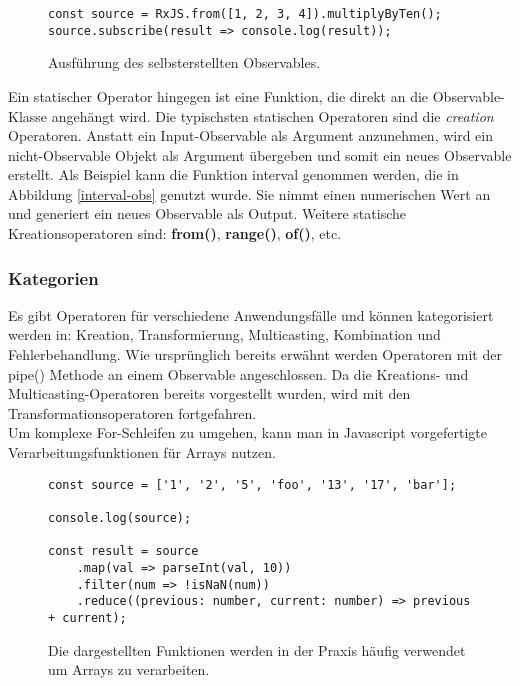 \begin{figure}[H]
\begin{lstlisting}[basicstyle=\small]
const source = RxJS.from([1, 2, 3, 4]).multiplyByTen();
source.subscribe(result => console.log(result));
\end{lstlisting}
\caption{Ausführung des selbsterstellten Observables.}
\end{figure}

\noindent
Ein statischer Operator hingegen ist eine Funktion, die direkt an die Observable-Klasse angehängt wird. Die typischsten statischen Operatoren sind die \textit{creation} Operatoren. Anstatt ein Input-Observable als Argument anzunehmen, wird ein nicht-Observable Objekt als Argument übergeben und somit ein neues Observable erstellt. Als Beispiel kann die Funktion interval genommen werden, die in Abbildung \ref{interval-obs} genutzt wurde. Sie nimmt einen numerischen Wert an und generiert ein neues Observable als Output. Weitere statische Kreationsoperatoren sind: \textbf{from()}, \textbf{range()}, \textbf{of()}, etc.

\subsubsection{Kategorien}

Es gibt Operatoren für verschiedene Anwendungsfälle und können kategorisiert werden in: Kreation, Transformierung, Multicasting, Kombination und Fehlerbehandlung. Wie ursprünglich bereits erwähnt werden Operatoren mit der pipe() Methode an einem Observable angeschlossen. Da die Kreations- und Multicasting-Operatoren bereits vorgestellt wurden, wird mit den Transformationsoperatoren fortgefahren.\\

\noindent
Um komplexe For-Schleifen zu umgehen, kann man in Javascript vorgefertigte Verarbeitungsfunktionen für Arrays nutzen.

\begin{figure}[H]
\begin{lstlisting}[basicstyle=\small]
const source = ['1', '2', '5', 'foo', '13', '17', 'bar'];

console.log(source);

const result = source
    .map(val => parseInt(val, 10))
    .filter(num => !isNaN(num))
    .reduce((previous: number, current: number) => previous + current);
\end{lstlisting}
\caption{Die dargestellten Funktionen werden in der Praxis häufig verwendet um Arrays zu verarbeiten.}
\end{figure}

